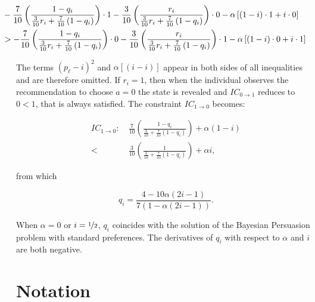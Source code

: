 \begin{align*}
	                      & \hspace{-1cm} - \frac{7}{10}             \left( \frac{1 - q_i}{\frac{3}{10} r_i + \frac{7}{10} \left( 1 - q_i \right)} \right)                                              \cdot 1 -            \frac{3}{10}             \left( \frac{r_i}{\frac{3}{10} r_i + \frac{7}{10} \left( 1 - q_i \right)} \right)         \cdot 0      - \alpha \left[ \left( 1 - i \right) \cdot 1 + i \cdot 0 \right]   \\
	                      & \hspace{-1cm} > - \frac{7}{10}             \left( \frac{1 - q_i}{\frac{3}{10} r_i + \frac{7}{10} \left( 1 - q_i \right)} \right)                                              \cdot 0 -            \frac{3}{10}             \left( \frac{r_i}{\frac{3}{10} r_i + \frac{7}{10} \left( 1 - q_i \right) } \right)         \cdot 1     - \alpha \left[ \left( 1 - i \right) \cdot 0 + i \cdot 1 \right]
\end{align*}

The terms \( \left( p_{\ell} - i \right)^{2} \) and \( \alpha \left[ \left( i - i \right) \right] \) appear in both sides of all inequalities and are therefore omitted. If \( r_i = 1 \), then when the individual observes the recommendation to choose \( a = 0 \) the state is revealed and \( IC_{0 \rightarrow 1} \) reduces to \( 0 < 1 \), that is always satisfied. The constraint \( IC_{1 \rightarrow 0} \) becomes:

\begin{align*}
	IC_{1 \rightarrow 0}: & \:  \frac{7}{10}             \left( \frac{1 - q_i}{\frac{3}{10} + \frac{7}{10} \left( 1 - q_i \right)} \right)                       + \alpha \left( 1 - i \right) \\
	<                     & \: \frac{3}{10}             \left( \frac{1}{\frac{3}{10} + \frac{7}{10} \left( 1 - q_i \right) } \right)        + \alpha i,
\end{align*}

from which

\[
	q_i = \frac{4 - 10 \alpha \left( 2i - 1\right)}{7 \left( 1 - \alpha \left( 2i  - 1 \right) \right)} .
\]

When \( \alpha = 0 \) or \( i = \nicefrac{1}{2} \), \( q_i \) coincides with the solution of the Bayesian Persuasion problem with standard preferences. The derivatives of \( q_i \) with respect to \( \alpha \) and \( i \) are both negative.

\section{Notation}\label{app:notation}

